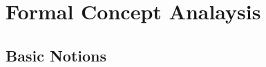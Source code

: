 \chapter{Formal Concept Analaysis}
\label{chapter:formal-concept-analysis}

\section{Basic Notions}
\label{section:basic-notions}

